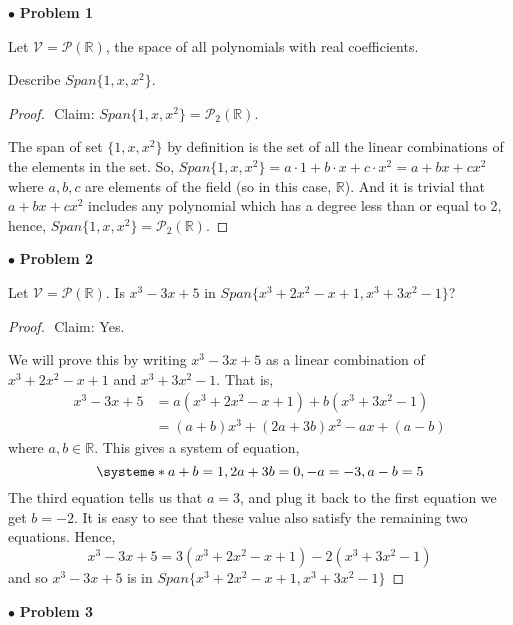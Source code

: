 \documentclass{article}
\begin{document}
$ \bullet$ \textbf{Problem 1}
\medskip

\begin{itshape}
Let $\mathcal{V} = \mathcal{P}(\mathbb{R})$, the space of all polynomials with real coefficients.

Describe $Span \{ 1,x,x^2 \}$.
\end{itshape}
\medskip

\begin{proof}
$ $\newline
Claim: $Span \{ 1,x,x^2 \} = \mathcal{P}_2(\mathbb{R})$.
\medskip

The span of set $\{ 1, x, x^2 \} $ by definition is the set of all the linear combinations of the elements in the set. So, $Span \{ 1,x,x^2 \} = a \cdot 1 + b \cdot x + c \cdot x^2 = a +bx+cx^2$ where $a,b,c$ are elements of the field (so in this case, $\mathbb{R}$). And it is trivial that $a+bx+cx^2$ includes any polynomial which has a degree less than or equal to 2, hence, $Span \{ 1,x,x^2 \} = \mathcal{P}_2(\mathbb{R})$.
\end{proof}

\newpage
$ \bullet$ \textbf{Problem 2}
\medskip

\begin{itshape}
Let $\mathcal{V} = \mathcal{P}(\mathbb{R})$. Is $x^3-3x+5$ in $Span\{ x^3+2x^2-x+1, x^3+3x^2-1 \}$?
\end{itshape}
\medskip

\begin{proof}
$ $\newline
Claim: Yes.

\medskip
We will prove this by writing $x^3-3x+5$ as a linear combination of $x^3+2x^2-x+1$ and $x^3+3x^2-1$. That is,
\begin{align*}
x^3-3x+5 &= a(x^3+2x^2-x+1) + b(x^3+3x^2-1) \\
&= (a+b)x^3+(2a+3b)x^2 -ax +(a-b)
\end{align*}
where $a ,b \in \mathbb{R}$. This gives a system of equation,
\[
\systeme*{a+b=1,2a+3b =0,-a=-3, a-b =5}
\]
The third equation tells us that $a=3$, and plug it back to the first equation we get $b=-2$. It is easy to see that these value also satisfy the remaining two equations. Hence, 
$$ x^3-3x+5 = 3(x^3+2x^2-x+1) -2(x^3+3x^2-1)$$
and so $x^3-3x+5$ is in $Span\{ x^3+2x^2-x+1, x^3+3x^2-1 \}$


\end{proof}

\newpage
$ \bullet$ \textbf{Problem 3}
\medskip
\end{document}

